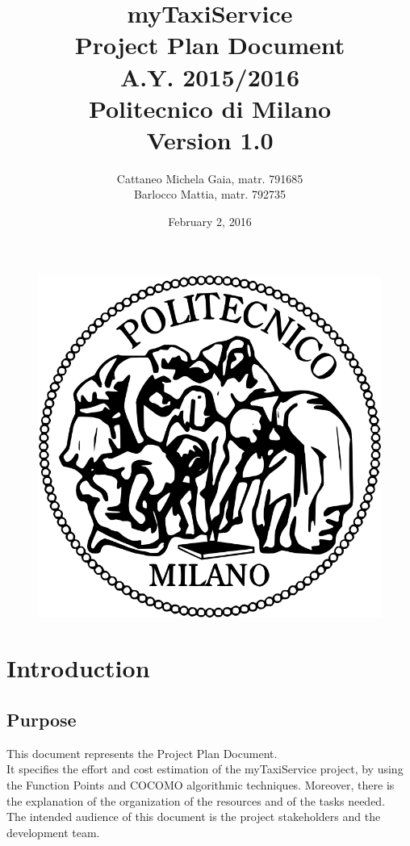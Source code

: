\documentclass[18pt,oneside,a4paper, titlepage]{article}
\begin{document}
\begin{figure}[t]
	\centering
	\includegraphics[scale=0.35]{logo-polimi.png}
\end{figure}
\title{\textbf{myTaxiService}\\\textbf{P}roject \textbf{P}lan \textbf{D}ocument\\ A.Y. 2015/2016\\
	Politecnico di Milano\\ Version 1.0}	
\author{Cattaneo Michela Gaia, matr. 791685\\Barlocco Mattia, matr. 792735 }
\date{February 2, 2016}
\maketitle

\newpage
\tableofcontents

\newpage
\section{Introduction}
	\subsection{Purpose}
		This document represents the Project Plan Document.\\ It specifies the effort and cost estimation of the myTaxiService project, by using the Function Points and COCOMO algorithmic techniques. Moreover, there is the explanation of the organization of the resources and of the tasks needed.\\
		The intended audience of this document is the project stakeholders and the development team.
\end{document}
